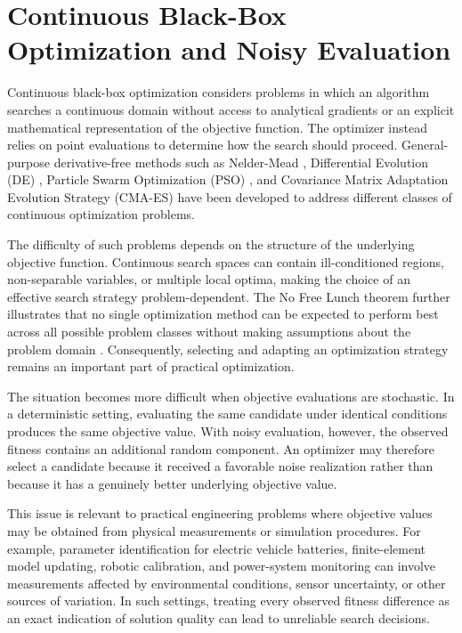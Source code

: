 \section{Continuous Black-Box Optimization and Noisy Evaluation}
\label{sec:intro_optimization}

Continuous black-box optimization considers problems in which an algorithm
searches a continuous domain without access to analytical gradients or an
explicit mathematical representation of the objective function. The optimizer
instead relies on point evaluations to determine how the search should proceed.
General-purpose derivative-free methods such as Nelder-Mead \cite{Nelder1965},
Differential Evolution (DE) \cite{Storn1997}, Particle Swarm Optimization (PSO)
\cite{Kennedy1995}, and Covariance Matrix Adaptation Evolution Strategy (CMA-ES)
\cite{Hansen2001} have been developed to address different classes of continuous
optimization problems.

The difficulty of such problems depends on the structure of the underlying
objective function. Continuous search spaces can contain ill-conditioned
regions, non-separable variables, or multiple local optima, making the choice of
an effective search strategy problem-dependent. The No Free Lunch theorem
further illustrates that no single optimization method can be expected to
perform best across all possible problem classes without making assumptions
about the problem domain \cite{Burke2013}. Consequently, selecting and adapting
an optimization strategy remains an important part of practical optimization.

The situation becomes more difficult when objective evaluations are stochastic.
In a deterministic setting, evaluating the same candidate under identical
conditions produces the same objective value. With noisy evaluation, however,
the observed fitness contains an additional random component. An optimizer may
therefore select a candidate because it received a favorable noise realization
rather than because it has a genuinely better underlying objective value.

This issue is relevant to practical engineering problems where objective values
may be obtained from physical measurements or simulation procedures. For
example, parameter identification for electric vehicle batteries, finite-element
model updating, robotic calibration, and power-system monitoring can involve
measurements affected by environmental conditions, sensor uncertainty, or other
sources of variation. In such settings, treating every observed fitness
difference as an exact indication of solution quality can lead to unreliable
search decisions.

